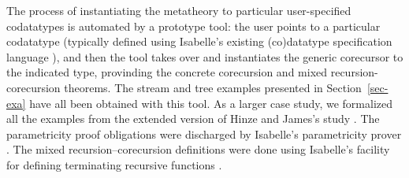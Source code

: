 \documentclass[preprint,draft]
{sigplanconf}
\newcommand{\<}{\langle}
\renewcommand{\>}{\rangle}
\begin{document}
The process of instantiating the metatheory to particular user-specified codatatypes
is automated by a prototype tool: the user points to a particular codatatype (typically defined using
Isabelle's existing (co)datatype specification language \cite{blanchette-et-al-2014-impl}), and then the tool
takes over and instantiates the generic corecursor to the indicated type, provinding the concrete corecursion
and mixed recursion-corecursion theorems.
The stream and
tree examples presented in Section~\ref{sec-exa} have all been obtained with this tool.
As a larger case study, we formalized all the examples
from the extended version of Hinze and James's study \cite{hinze-adventure}. The parametricity proof obligations were discharged by Isabelle's
parametricity prover \cite{huffman-lifting}.
The mixed recursion--corecursion definitions were done using Isabelle's
facility for defining terminating recursive functions \cite{krauss-fun}.
\end{document}
